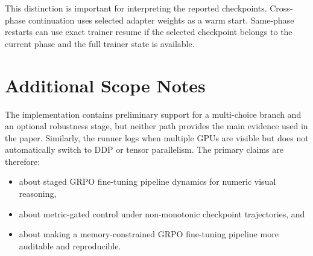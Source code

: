 \documentclass{article} %
\begin{document}
This distinction is important for interpreting the reported checkpoints. Cross-phase continuation uses selected adapter weights as a warm start. Same-phase restarts can use exact trainer resume if the selected checkpoint belongs to the current phase and the full trainer state is available.

\section{Additional Scope Notes}

The implementation contains preliminary support for a multi-choice branch and an optional robustness stage, but neither path provides the main evidence used in the paper. Similarly, the runner logs when multiple GPUs are visible but does not automatically switch to DDP or tensor parallelism. The primary claims are therefore:
\begin{itemize}[leftmargin=1.2em]
\item about staged GRPO fine-tuning pipeline dynamics for numeric visual reasoning,
\item about metric-gated control under non-monotonic checkpoint trajectories, and
\item about making a memory-constrained GRPO fine-tuning pipeline more auditable and reproducible.
\end{itemize}
\end{document}
